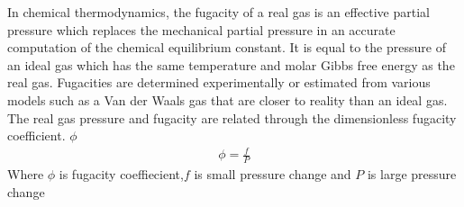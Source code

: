 \begin{chembox}{}
    {In chemical thermodynamics, the fugacity of a real gas is an effective partial pressure which replaces the mechanical partial pressure in an accurate computation of the chemical equilibrium constant. It is equal to the pressure of an ideal gas which has the same temperature and molar Gibbs free energy as the real gas.}
    {Fugacities are determined experimentally or estimated from various models such as a Van der Waals gas that are closer to reality than an ideal gas. The real gas pressure and fugacity are related through the dimensionless fugacity coefficient. $\phi$}
    \begin{align*}
        \phi = \frac{f}{P}
    \end{align*}
    {Where $\phi$ is fugacity coeffiecient,$f$ is small pressure change and $P$ is large pressure change}
\end{chembox}
